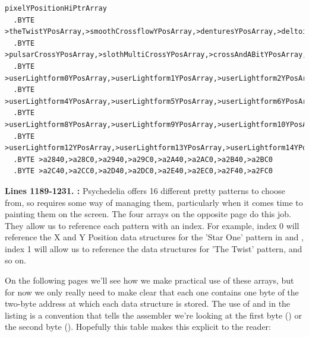 \begin{lstlisting}
pixelYPositionHiPtrArray   
  .BYTE >theTwistYPosArray,>smoothCrossflowYPosArray,>denturesYPosArray,>deltoidsYPosArray
  .BYTE >pulsarCrossYPosArray,>slothMultiCrossYPosArray,>crossAndABitYPosArray,>start2YPosArray
  .BYTE >userLightform0YPosArray,>userLightform1YPosArray,>userLightform2YPosArray,>userLightform3YPosArray
  .BYTE >userLightform4YPosArray,>userLightform5YPosArray,>userLightform6YPosArray,>userLightform7YPosArray
  .BYTE >userLightform8YPosArray,>userLightform9YPosArray,>userLightform10YPosArray,>userLightform11YPosArray
  .BYTE >userLightform12YPosArray,>userLightform13YPosArray,>userLightform14YPosArray,>userLightform15YPosArray
  .BYTE >a2840,>a28C0,>a2940,>a29C0,>a2A40,>a2AC0,>a2B40,>a2BC0
  .BYTE >a2C40,>a2CC0,>a2D40,>a2DC0,>a2E40,>a2EC0,>a2F40,>a2FC0

\end{lstlisting}
\clearpage

\textbf{Lines 1189-1231. :} Psychedelia
offers 16 different pretty patterns to choose from, so requires some way of managing them, particularly
when it comes time to painting them on the screen. The four arrays on the opposite page do this job.
They allow us to reference each pattern with an index. For example, index 0 will reference the X and
Y Position data structures for the 'Star One' pattern in  and 
, index 1 will allow us to reference the data structures for 'The Twist' pattern,
and so on.

On the following pages we'll see how we make practical use of these arrays, but for now we only really
need to make clear that each one contains one byte of the two-byte address at which each
data structure is stored. The use of \icode{<} and \icode{>} in the listing is a convention that
tells the assembler we're looking at the first byte (\icode{>}) or the second byte (\icode{<}).
Hopefully this table makes this explicit to the reader:

